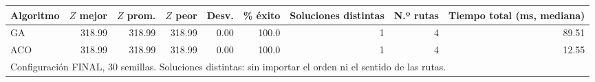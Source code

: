 \begin{tabular}{lrrrrrrrr}
\toprule
Algoritmo & $Z$ mejor & $Z$ prom. & $Z$ peor & Desv. & \% éxito & Soluciones distintas & N.º rutas & Tiempo total (ms, mediana) \\
\midrule
GA & 318.99 & 318.99 & 318.99 & 0.00 & 100.0 & 1 & 4 & 89.51 \\
ACO & 318.99 & 318.99 & 318.99 & 0.00 & 100.0 & 1 & 4 & 12.55 \\
\midrule
\multicolumn{9}{l}{Configuración FINAL, 30 semillas. Soluciones distintas: sin importar el orden ni el sentido de las rutas.} \\
\bottomrule
\end{tabular}
